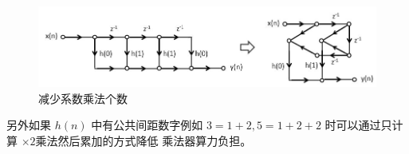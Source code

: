 \begin{center}
    \begin{figure}[ht!]
        \centering
        \includegraphics[scale=0.6]{figures/FIR_Optimizing.jpg}
        \caption{减少系数乘法个数}
        \label{fig:FIR-Optimizing}
    \end{figure}
\end{center}
另外如果 $h(n)$ 中有公共间距数字例如 $3 = 1+2 , 5 = 1+ 2+ 2$ 时可以通过只计算 $\times 2$乘法然后累加的方式降低
乘法器算力负担。

\paragraph{}

